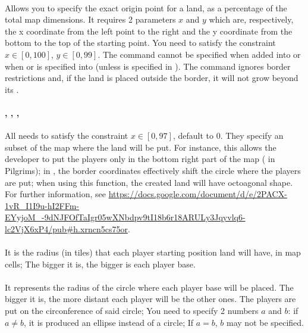 \begin{appendices}
    \paragraph{}
    Allows you to specify the exact origin point for a land, as a percentage of the total map dimensions. It requires 2 parameters $x$ and $y$ which are, respectively, the x coordinate from the left point to the right and the y coordinate from the bottom to the top of the starting point. You need to satisfy the constraint $x \in [0,100]$, $y \in [0, 99]$. The command cannot be specified when added into  or when  or  is specified into  (unless  is specified in ). The command ignores border restrictions and, if the land is placed outside the border, it will not grow beyond its .

    \paragraph{, , , }
    All needs to satisfy the constraint $x \in [0,97]$, default to $0$. They specify an subset of the map where the land will be put. For instance, this allows the developer to put the players only in the bottom right part of the map (\eg{} in Pilgrims); in , the border coordinates effectively shift the circle where the players are put; when using this function, the created land will have octoagonal shape. For further information, see \url{https://docs.google.com/document/d/e/2PACX-1vR_I1I9u-hI2FFm-EYyjoM_-9dNJFOfTaIgr05wXNbdpv9tI18b6r18ARULy3Jqyvlq6-lc2VjX6xP4/pub#h.xrncn5cs75or}.

    \paragraph{}

    \paragraph{}
    It is the radius (in tiles) that each player starting position land will have, in map cells; The bigger it is, the bigger is each player base.

    \paragraph{}
    It represents the radius of the circle where each player base will be placed. The bigger it is, the more distant each player will be \wrt{}the other ones. The players are put on the circonference of said circle; You need to specify 2 numbers $a$ and $b$: if $a \not = b$, it is produced an ellipse instead of a circle; If $a=b$, $b$ may not be specified.


\end{appendices}
